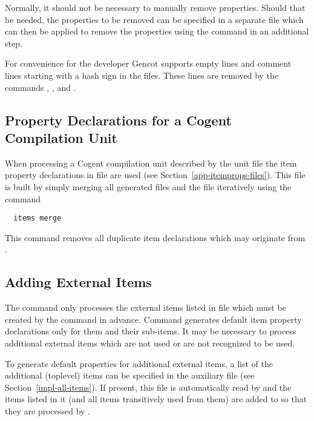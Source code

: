 Normally, it should not be necessary to manually remove properties. Should that be needed, the properties to be removed can
be specified in a separate file which can then be applied to remove the properties using the command  in 
an additional step.

For convenience for the developer Gencot supports empty lines and comment lines starting with a hash sign \code{\#} in the 
 files. These lines are removed by the commands , , and .

\subsection{Property Declarations for a Cogent Compilation Unit}
\label{app-itemprops-unit}

When processing a Cogent compilation unit described by the unit file  the item property declarations in file
 are used (see Section~\ref{app-itemprops-files}). This file is built by simply merging all
generated files  and the file  iteratively using the command
\begin{verbatim}
  items merge
\end{verbatim}
This command removes all duplicate item declarations which may originate from .

\subsection{Adding External Items}
\label{app-itemprops-extern}

The command  only processes the external items listed in file  which must be created
by the command  in advance. Command  generates default item property declarations only
for them and their sub-items. It may be necessary to process additional external items which are not used or are not recognized
to be used. 

To generate default properties for additional external items, a list of the additional (toplevel) items can be 
specified in the auxiliary file  (see Section~\ref{impl-all-items}). If present, this file is 
automatically read by  and the items listed in it (and all items transitively used from them) are added to 
 so that they are processed by .

